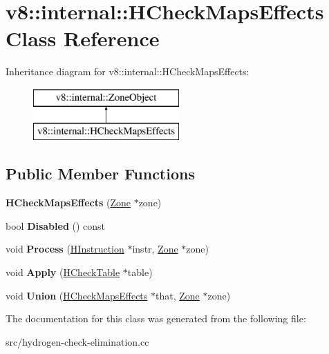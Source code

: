 \hypertarget{classv8_1_1internal_1_1_h_check_maps_effects}{}\section{v8\+:\+:internal\+:\+:H\+Check\+Maps\+Effects Class Reference}
\label{classv8_1_1internal_1_1_h_check_maps_effects}
Inheritance diagram for v8\+:\+:internal\+:\+:H\+Check\+Maps\+Effects\+:\begin{figure}[H]
\begin{center}
\leavevmode
\includegraphics[height=2.000000cm]{classv8_1_1internal_1_1_h_check_maps_effects}
\end{center}
\end{figure}
\subsection*{Public Member Functions}
\begin{DoxyCompactItemize}
\item 
\hypertarget{classv8_1_1internal_1_1_h_check_maps_effects_a4f3f3d6d4c24e321208ba9bd4ecd1cd6}{}{\bfseries H\+Check\+Maps\+Effects} (\hyperlink{classv8_1_1internal_1_1_zone}{Zone} $\ast$zone)\label{classv8_1_1internal_1_1_h_check_maps_effects_a4f3f3d6d4c24e321208ba9bd4ecd1cd6}

\item 
\hypertarget{classv8_1_1internal_1_1_h_check_maps_effects_a12d7a62b36691d9b019bab8e3d5f52fb}{}bool {\bfseries Disabled} () const \label{classv8_1_1internal_1_1_h_check_maps_effects_a12d7a62b36691d9b019bab8e3d5f52fb}

\item 
\hypertarget{classv8_1_1internal_1_1_h_check_maps_effects_adc100710ba231361ae11018ee8778c57}{}void {\bfseries Process} (\hyperlink{classv8_1_1internal_1_1_h_instruction}{H\+Instruction} $\ast$instr, \hyperlink{classv8_1_1internal_1_1_zone}{Zone} $\ast$zone)\label{classv8_1_1internal_1_1_h_check_maps_effects_adc100710ba231361ae11018ee8778c57}

\item 
\hypertarget{classv8_1_1internal_1_1_h_check_maps_effects_a8bde6a324d6de6da382f802a7c3fdaad}{}void {\bfseries Apply} (\hyperlink{classv8_1_1internal_1_1_h_check_table}{H\+Check\+Table} $\ast$table)\label{classv8_1_1internal_1_1_h_check_maps_effects_a8bde6a324d6de6da382f802a7c3fdaad}

\item 
\hypertarget{classv8_1_1internal_1_1_h_check_maps_effects_a39980a8d8c314c5f903f3074f7561ff5}{}void {\bfseries Union} (\hyperlink{classv8_1_1internal_1_1_h_check_maps_effects}{H\+Check\+Maps\+Effects} $\ast$that, \hyperlink{classv8_1_1internal_1_1_zone}{Zone} $\ast$zone)\label{classv8_1_1internal_1_1_h_check_maps_effects_a39980a8d8c314c5f903f3074f7561ff5}

\end{DoxyCompactItemize}


The documentation for this class was generated from the following file\+:\begin{DoxyCompactItemize}
\item 
src/hydrogen-\/check-\/elimination.\+cc\end{DoxyCompactItemize}
